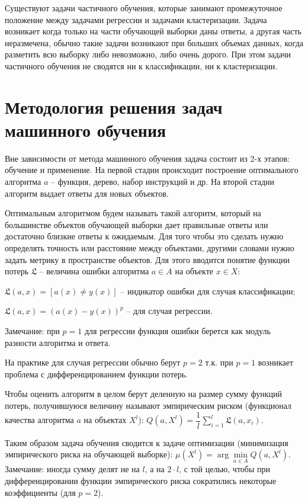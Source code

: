Существуют задачи частичного обучения, которые занимают промежуточное положение между задачами регрессии и задачами кластеризации. Задача возникает когда только на части обучающей выборки даны ответы, а другая часть неразмечена, обычно такие задачи возникают при больших объемах данных, когда разметить всю выборку либо невозможно, либо очень дорого. При этом задачи частичного обучения не сводятся ни к классификации, ни к кластеризации.


\section{Методология решения задач машинного обучения}

Вне зависимости от метода машинного обучения задача состоит из 2-х этапов: обучение и применение.
На первой стадии происходит построение оптимального алгоритма $a$ -- функция, дерево, набор инструкций и др. На второй стадии алгоритм выдает ответы для новых объектов.

Оптимальным алгоритмом будем называть такой алгоритм, который на большинстве объектов обучающей выборки дает правильные ответы или достаточно близкие ответы к ожидаемым. Для того чтобы это сделать нужно определять точность или расстояние между объектами, другими словами нужно задать метрику в пространстве объектов. Для этого вводится понятие функции потерь $\mathfrak{L}$ -- величина ошибки алгоритма $a \in A$ на объекте $x \in X$:
\begin{description}[font=$\bullet$]
    \item $\mathfrak{L} (a,x)=[a(x) \neq y(x)]$ -- индикатор ошибки для случая классификации;
    \item $\mathfrak{L} (a,x)= (a(x) - y(x))^p$ -- для случая регрессии.
\end{description}
Замечание: при $p=1$ для регрессии функция ошибки берется как модуль разности алгоритма и ответа.

На практике для случая регрессии обычно берут $p=2$ т.к. при $p=1$ возникает проблема с дифференцированием функции потерь. 

Чтобы оценить алгоритм в целом берут деленную на размер сумму функций потерь, получившуюся величину называют эмпирическим риском (функционал качества алгоритма $a$ на объектах $X^l$): $Q(a, X^l) = \dfrac{1}{l}\sum\limits_{i=1}^{l}\mathfrak{L}(a,x_i)$.

Таким образом задача обучения сводится к задаче оптимизации (минимизация эмпирического риска на обучающей выборке): $\mu(X^l) = \arg\min\limits_{a \in A} Q(a,X^l)$.\\
Замечание: иногда сумму делят не на $l$, а на $2 \cdot l$, с той целью, чтобы при дифференцировании функции эмпирического риска сократились некоторые коэффициенты (для $p=2$).

